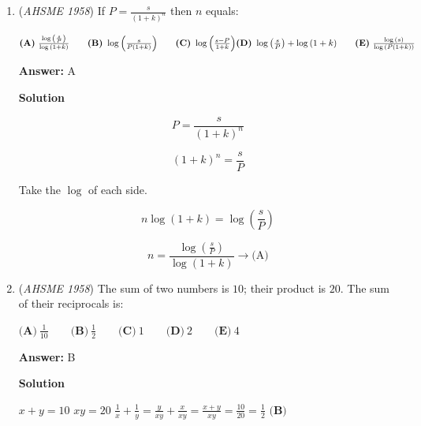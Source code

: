 \begin{enumerate}
 $\textbf{(A)}\ \text{unlimited}\qquad  \textbf{(B)}\ 3\qquad  \textbf{(C)}\ 2\qquad  \textbf{(D)}\ 1\qquad  \textbf{(E)}\ 0$

 \textbf{Answer: }C



\textbf{Solution}

Solve the equation for x.

 
 \[\sqrt{5-x}=x\sqrt{5-x}\]

 \[x\sqrt{5-x} - \sqrt{5-x} = 0\]

 \[(x-1)\sqrt{5-x}=0\]

 \[x=1,5\]

 There are two solutions $\to \boxed{\textbf{(C)}}$



	\item (\textit{AHSME 1958}) If $P = \frac{s}{(1 + k)^n}$ then $n$ equals:


 $\textbf{(A)}\ \frac{\log{\left(\frac{s}{P}\right)}}{\log{(1 + k)}}\qquad  \textbf{(B)}\ \log{\left(\frac{s}{P(1 + k)}\right)}\qquad  \textbf{(C)}\ \log{\left(\frac{s - P}{1 + k}\right)}\qquad \\ \textbf{(D)}\ \log{\left(\frac{s}{P}\right)} + \log{(1 + k)}\qquad  \textbf{(E)}\ \frac{\log{(s)}}{\log{(P(1 + k))}}$

 \textbf{Answer: }A



\textbf{Solution}


 \[P=\frac{s}{(1+k)^n}\]

 \[(1+k)^n=\frac{s}{P}\]

 Take the $\log$ of each side.

 
 \[n \log(1+k) = \log\left(\frac{s}{P}\right)\]

 \[n = \frac{\log\left(\frac{s}{P}\right)}{\log(1+k)} \to \boxed{\text{(A)}}\]



	\item (\textit{AHSME 1958}) The sum of two numbers is $10$; their product is $20$. The sum of their reciprocals is:


 $\textbf{(A)}\ \frac{1}{10}\qquad  \textbf{(B)}\ \frac{1}{2}\qquad  \textbf{(C)}\ 1\qquad  \textbf{(D)}\ 2\qquad  \textbf{(E)}\ 4$

 \textbf{Answer: }B



\textbf{Solution}

$x+y=10$
$xy=20$
$\frac1x+\frac1y=\frac{y}{xy}+\frac{x}{xy}=\frac{x+y}{xy}=\frac{10}{20}=\boxed{\frac12\textbf{ (B)}}$


\end{enumerate}
